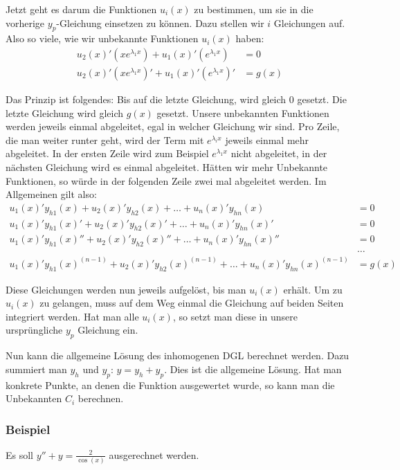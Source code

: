 Jetzt geht es darum die Funktionen $u_i(x)$ zu bestimmen, um sie in die vorherige
$y_p$-Gleichung einsetzen zu können. Dazu stellen wir $i$ Gleichungen auf.
Also so viele, wie wir unbekannte Funktionen $u_i(x)$ haben:
\begin{align*}
u_2(x)' (x e^{\lambda_1 x}) + u_1(x)' (e^{\lambda_1 x}) &= 0\\
u_2(x)' (x e^{\lambda_1 x})' + u_1(x)' (e^{\lambda_1 x})' &= g(x)
\end{align*}

Das Prinzip ist folgendes: Bis auf die letzte Gleichung, wird gleich $0$ gesetzt.
Die letzte Gleichung wird gleich $g(x)$ gesetzt.
Unsere unbekannten Funktionen werden jeweils einmal abgeleitet, egal in welcher
Gleichung wir sind. Pro Zeile, die man weiter runter geht, wird der Term mit $e^{\lambda_i x}$
jeweils einmal mehr abgeleitet. In der ersten Zeile wird zum Beispiel $e^{\lambda_1 x}$ nicht abgeleitet,
in der nächsten Gleichung wird es einmal abgeleitet. Hätten wir mehr Unbekannte Funktionen,
so würde in der folgenden Zeile zwei mal abgeleitet werden. Im Allgemeinen gilt also:
{\footnotesize
\begin{align*}
u_1(x)' y_{h1}(x) + u_2(x)' y_{h2}(x) + \ldots + u_n(x)' y_{hn}(x) &= 0\\
u_1(x)' y_{h1}(x)' + u_2(x)' y_{h2}(x)' + \ldots + u_n(x)' y_{hn}(x)' &= 0\\
u_1(x)' y_{h1}(x)'' + u_2(x)' y_{h2}(x)'' + \ldots + u_n(x)' y_{hn}(x)'' &= 0\\
&\ldots\\
u_1(x)' y_{h1}(x)^{(n-1)} + u_2(x)' y_{h2}(x)^{(n-1)} + \ldots + u_n(x)' y_{hn}(x)^{(n-1)} &= g(x)
\end{align*}
}

Diese Gleichungen werden nun jeweils aufgelöst, bis man $u_i(x)$ erhält. Um zu
$u_i(x)$ zu gelangen, muss auf dem Weg einmal die Gleichung auf beiden Seiten
integriert werden. Hat man alle $u_i(x)$, so setzt man diese in unsere
ursprüngliche $y_p$ Gleichung ein.

Nun kann die allgemeine Lösung des inhomogenen DGL berechnet werden. Dazu
summiert man $y_h$ und $y_p$: $y = y_h + y_p$. Dies ist die allgemeine Lösung.
Hat man konkrete Punkte, an denen die Funktion ausgewertet wurde, so kann man
die Unbekannten $C_i$ berechnen.

\subsubsection*{Beispiel}
Es soll $y'' + y = \frac{2}{\cos(x)}$ ausgerechnet werden.

